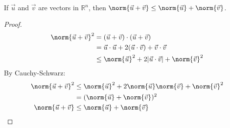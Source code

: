 \documentclass[12pt]{article}
\begin{document}
\begin{theorem}
If $\vec{u}$ and $\vec{v}$ are vectors in $\mathbb{R}^n$, then $\norm{\vec{u} + \vec{v}} \le \norm{\vec{u}} + \norm{\vec{v}}$.
\end{theorem}

\begin{proof}
\[
\begin{aligned}
\norm{\vec{u} + \vec{v}}^2 &= (\vec{u} + \vec{v})\cdot(\vec{u} + \vec{v}) \\
&= \vec{u}\cdot\vec{u} + 2(\vec{u}\cdot\vec{v}) + \vec{v}\cdot\vec{v} \\
&\le \norm{\vec{u}}^2 + 2|\vec{u}\cdot\vec{v}| + \norm{\vec{v}}^2  \\
\end{aligned}
\]
By Cauchy-Schwarz:
\[
\begin{aligned}
\norm{\vec{u} + \vec{v}}^2 &\le \norm{\vec{u}}^2 + 2\norm{\vec{u}}\norm{\vec{v}} + \norm{\vec{v}}^2 \\
&= (\norm{\vec{u}} + \norm{\vec{v}})^2 \\
\norm{\vec{u} + \vec{v}} &\le \norm{\vec{u}} + \norm{\vec{v}}
\end{aligned}
\]
\end{proof}
\end{document}
